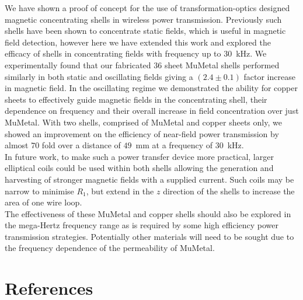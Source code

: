 \documentclass[11pt]{iopart}
\begin{document}
We have shown a proof of concept for the use of transformation-optics
designed magnetic concentrating shells in wireless power
transmission. Previously such shells have been shown to concentrate
static fields, which is useful in magnetic field detection, however here
we have extended this work and explored the efficacy of shells in
concentrating fields with frequency up to $30$~kHz. We experimentally
found that our fabricated $36$ sheet MuMetal shells performed
similarly in both static and oscillating fields giving a $(2.4\pm0.1)$
factor increase in magnetic field. In the oscillating regime we
demonstrated the ability for copper sheets to effectively guide magnetic
fields in the concentrating shell, their dependence on frequency and their
overall increase in field concentration over just MuMetal. With two
shells, comprised of MuMetal and copper sheets only, we showed an
improvement on the efficiency of near-field power transmission by
almost $70$ fold over a distance of $49$~mm at a frequency of
$30$~kHz.\\
In future work, to make such a power transfer device more practical,
larger elliptical coils could be used within both shells allowing the
generation and harvesting of stronger magnetic fields with a supplied
current. Such coils may be narrow to minimise $R_1$, but extend in the
$z$ direction of the shells to increase the area of one wire
loop.\\ The effectiveness of these MuMetal and copper shells should
also be explored in the mega-Hertz frequency range as is required by
some high efficiency power transmission
strategies\cite{soljacic}. Potentially other materials will need to be
sought due to the frequency dependence of the permeability of MuMetal.

\section{References}
\end{document}
